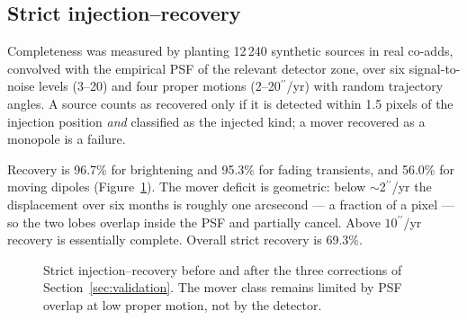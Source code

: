 \documentclass[11pt,a4paper]{article}
\newcommand{\arcsec}{\ensuremath{{}^{\prime\prime}}}
\begin{document}
{\subsection{Strict injection--recovery}
Completeness was measured by planting 12\,240 synthetic sources in real co-adds, convolved with the
empirical PSF of the relevant detector zone, over six signal-to-noise levels (3--20) and four proper
motions (2--20$\arcsec$/yr) with random trajectory angles. A source counts as recovered only if it is
detected within 1.5 pixels of the injection position \emph{and} classified as the injected kind; a
mover recovered as a monopole is a failure.

Recovery is 96.7\% for brightening and 95.3\% for fading transients, and 56.0\% for moving dipoles
(Figure~\ref{fig:recovery}). The mover deficit is geometric: below $\sim$2$\arcsec$/yr the
displacement over six months is roughly one arcsecond --- a fraction of a pixel --- so the two lobes
overlap inside the PSF and partially cancel. Above $10\arcsec$/yr recovery is essentially complete.
Overall strict recovery is 69.3\%.

\begin{figure}[t]
\centering
{}
\caption{Strict injection--recovery before and after the three corrections of
Section~\ref{sec:validation}. The mover class remains limited by PSF overlap at low proper motion,
not by the detector.}
\label{fig:recovery}
\end{figure}


}
\end{document}
